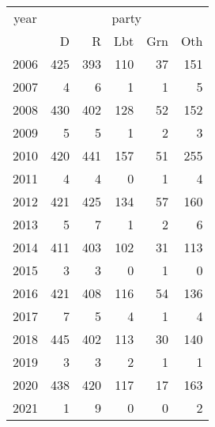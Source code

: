 \footnotesize\begin{tabular}[t]{lrrrrr}
\toprule
\multicolumn{1}{c}{year} & \multicolumn{5}{c}{party} \\
\cmidrule(l{3pt}r{3pt}){1-1} \cmidrule(l{3pt}r{3pt}){2-6}
  & D & R & Lbt & Grn & Oth\\
\midrule
2006 & 425 & 393 & 110 & 37 & 151\\
2007 & 4 & 6 & 1 & 1 & 5\\
2008 & 430 & 402 & 128 & 52 & 152\\
2009 & 5 & 5 & 1 & 2 & 3\\
2010 & 420 & 441 & 157 & 51 & 255\\
2011 & 4 & 4 & 0 & 1 & 4\\
2012 & 421 & 425 & 134 & 57 & 160\\
2013 & 5 & 7 & 1 & 2 & 6\\
2014 & 411 & 403 & 102 & 31 & 113\\
2015 & 3 & 3 & 0 & 1 & 0\\
2016 & 421 & 408 & 116 & 54 & 136\\
2017 & 7 & 5 & 4 & 1 & 4\\
2018 & 445 & 402 & 113 & 30 & 140\\
2019 & 3 & 3 & 2 & 1 & 1\\
2020 & 438 & 420 & 117 & 17 & 163\\
2021 & 1 & 9 & 0 & 0 & 2\\
\bottomrule
\end{tabular}
